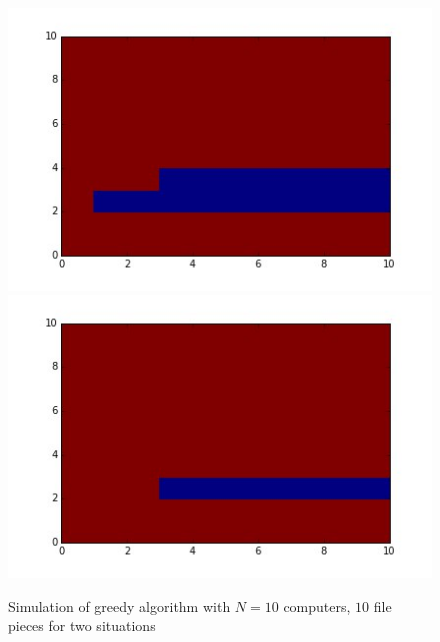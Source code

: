 \documentclass[10pt,a4paper]{article}
\begin{document}
\begin{figure}
	\includegraphics[scale=0.5]{pics/004}  \\
	\includegraphics[scale=0.5]{pics/005} \\
	\caption{Simulation of greedy algorithm with $N = 10$ computers, $10$ file pieces for two situations}
\end{figure}
\end{document}
